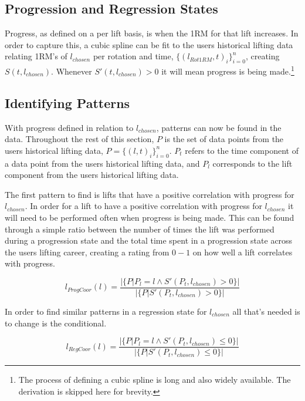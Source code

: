 \subsection{Progression and Regression States}
Progress, as defined on a per lift basis, is when the 1RM for that lift increases. In order to capture this, a cubic spline can be fit to the users historical lifting data relating 1RM's of $l_{chosen}$ per rotation and time, $\{(l_{Rot1RM},t)_i\}_{i=0}^n$, creating $S(t,l_{chosen})$. Whenever $S'(t,l_{chosen})>0$ it will mean progress is being made.\footnote{The process of defining a cubic spline is long and also widely available. The derivation is skipped here for brevity.}

\subsection{Identifying Patterns}
With progress defined in relation to $l_{chosen}$, patterns can now be found in the data. Throughout the rest of this section, $P$ is the set of data points from the users historical lifting data, $P=\{(l,t)_i\}_{i=0}^n$. $P_t$ refers to the time component of a data point from the users historical lifting data, and $P_l$ corresponds to the lift component from the users historical lifting data.

The first pattern to find is lifts that have a positive correlation with progress for $l_{chosen}$. In order for a lift to have a positive correlation with progress for $l_{chosen}$ it will need to be performed often when progress is being made. This can be found through a simple ratio between the number of times the lift was performed during a progression state and the total time spent in a progression state across the users lifting career, creating a rating from $0-1$ on how well a lift correlates with progress.

\begin{equation}
    l_{ProgCoor}(l)=\frac{\left| \{ P | P_l=l \land S'(P_t,l_{chosen})>0 \} \right|}
                         {\left| \{ P | S'(P_t,l_{chosen})>0 \} \right|}
\end{equation}

In order to find similar patterns in a regression state for $l_{chosen}$ all that's needed is to change is the conditional.

\begin{equation}
    l_{RegCoor}(l)=\frac{\left| \{ P | P_l=l \land S'(P_t,l_{chosen})\le0 \} \right|}
                        {\left| \{ P | S'(P_t,l_{chosen})\le0 \} \right|}
\end{equation}

